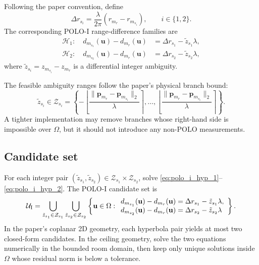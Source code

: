 \documentclass[11pt]{article}
\begin{document}
Following the paper convention, define
\begin{equation}
    \Delta r_{s_i}
    =\frac{\lambda}{2\pi}\left(r_{m_r}-r_{m_{s_i}}\right),
    \qquad i\in\{1,2\}.
    \label{eq:polo_i_differential_phase}
\end{equation}
The corresponding POLO-I range-difference families are
\begin{align}
    \mathcal{H}_1:\quad
    d_{m_{s_1}}(\mathbf{u})-d_{m_r}(\mathbf{u})
    &=\Delta r_{s_1}-\tilde z_{s_1}\lambda,\label{eq:polo_i_hyp_1}\\
    \mathcal{H}_2:\quad
    d_{m_{s_2}}(\mathbf{u})-d_{m_r}(\mathbf{u})
    &=\Delta r_{s_2}-\tilde z_{s_2}\lambda,\label{eq:polo_i_hyp_2}
\end{align}
where $\tilde z_{s_i}=z_{m_{s_i}}-z_{m_r}$ is a differential integer ambiguity.

The feasible ambiguity ranges follow the paper's physical branch bound:
\begin{equation}
    \tilde z_{s_i}\in\mathcal{Z}_{s_i}
    =\left\{-\left\lfloor\frac{\|\mathbf{p}_{m_r}-\mathbf{p}_{m_{s_i}}\|_2}{\lambda}\right\rceil,
    \ldots,
    \left\lfloor\frac{\|\mathbf{p}_{m_r}-\mathbf{p}_{m_{s_i}}\|_2}{\lambda}\right\rceil\right\}.
    \label{eq:polo_i_integer_range}
\end{equation}
A tighter implementation may remove branches whose right-hand side is impossible over $\Omega$, but it should not introduce any non-POLO measurements.

\subsection{Candidate set}

For each integer pair $(\tilde z_{s_1},\tilde z_{s_2})\in\mathcal{Z}_{s_1}\times\mathcal{Z}_{s_2}$, solve \eqref{eq:polo_i_hyp_1}--\eqref{eq:polo_i_hyp_2}. The POLO-I candidate set is
\begin{equation}
    \mathcal{U}_{\rm I}
    =\bigcup_{\tilde z_{s_1}\in\mathcal{Z}_{s_1}}
    \bigcup_{\tilde z_{s_2}\in\mathcal{Z}_{s_2}}
    \left\{\mathbf{u}\in\Omega:
    \begin{array}{l}
    d_{m_{s_1}}(\mathbf{u})-d_{m_r}(\mathbf{u})=\Delta r_{s_1}-\tilde z_{s_1}\lambda,\\
    d_{m_{s_2}}(\mathbf{u})-d_{m_r}(\mathbf{u})=\Delta r_{s_2}-\tilde z_{s_2}\lambda
    \end{array}
    \right\}.
    \label{eq:polo_i_candidate_set}
\end{equation}
In the paper's coplanar 2D geometry, each hyperbola pair yields at most two closed-form candidates. In the ceiling geometry, solve the two equations numerically in the bounded room domain, then keep only unique solutions inside $\Omega$ whose residual norm is below a tolerance.
\end{document}
